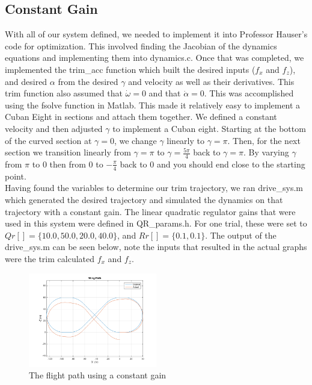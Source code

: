 \documentclass[journal]{IEEEtran}
\begin{document}
\subsection{Constant Gain}
With all of our system defined, we needed to implement it into Professor Hauser's code for optimization. This involved finding the Jacobian of the dynamics equations and implementing them into dynamics.c. Once that was completed, we implemented the trim\_acc function which built the desired inputs ($f_x$ and $f_z$), and desired $\alpha$ from the desired $\gamma$ and velocity as well as their derivatives. This trim function also assumed that $\dot{\omega}=0$ and that $\dot{\alpha}=0$. This was
accomplished using the fsolve function in Matlab. This made it relatively easy to implement a Cuban Eight in sections and attach them together. We defined a constant velocity and then adjusted $\gamma$ to implement a Cuban eight. Starting at the bottom of the curved section at $\gamma=0$, we change $\gamma$ linearly to $\gamma=\pi$. Then, for the next section we transition linearly from $\gamma=\pi$ to $\gamma=\frac{5\pi}{4}$ back to $\gamma=\pi$. By varying $\gamma$ from $\pi$ to $0$ then
from $0$ to $-\frac{\pi}{4}$ back to $0$ and you should end close to the starting point.\\
\indent Having found the variables to determine our trim trajectory, we ran drive\_sys.m which generated the desired trajectory and simulated the dynamics on that trajectory with a constant gain. The linear quadratic regulator gains that were used in this system were defined in QR\_params.h. For one trial, these were set to $Qr[]=\{10.0,50.0,20.0,40.0\}$, and $Rr[]=\{0.1,0.1\}$. The output of the drive\_sys.m can be seen below, note the inputs that resulted in the actual graphs were
the trim calculated $f_x$ and $f_z$.
\begin{figure}[h!]
    \centering
    \includegraphics[width=0.5\textwidth]{Flight_Path_Constant_Gain.png}
    \caption{The flight path using a constant gain}
\end{figure}\\
\end{document}
